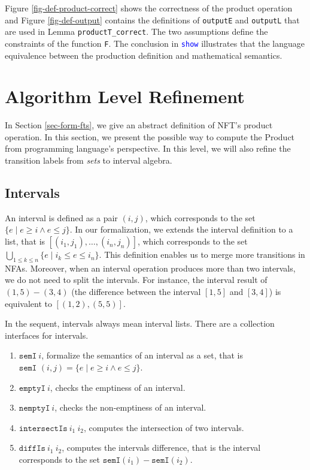 \documentclass[a4paper,UKenglish,cleveref, autoref, thm-restate]{lipics-v2021}
\begin{document}
Figure \ref{fig-def-product-correct} shows the correctness of the product operation and Figure \ref{fig-def-output} contains the definitions of \texttt{outputE} and \texttt{outputL} that are used in Lemma \texttt{productT\_correct}.
The two assumptions define the constraints of the function \texttt{F}.
The conclusion in \textcolor{blue}{\texttt{show}} illustrates 
that the language equivalence between the production definition and mathematical semantics.

\section{Algorithm Level Refinement}
\label{sec_alg_refinement}
In Section \ref{sec-form-fts}, we give an abstract definition of NFT's product operation. In this section, we present the possible way to compute the Product from programming language's perspective.
In this level, we will also refine the transition labels from \emph{sets} to interval algebra.

\subsection{Intervals}
An interval is defined as a pair $(i, j)$, which corresponds to the set $\{e \mid e \geq i \land e \leq j\}$. In our formalization, we extends the interval definition to a list, that is $[(i_1, j_1), \ldots, (i_n, j_n)]$, which corresponds to the set $\bigcup_{1\leq k\leq n}\{e \mid i_k \leq e \leq i_n\}$. This definition enables us to merge more transitions in NFAs. Moreover, when an interval operation produces more than two intervals, we do not need to split the intervals. For instance, the interval result of $(1, 5) - (3, 4)$ (the difference between the interval $[1, 5]$ and $[3, 4]$) is equivalent to $[(1, 2), (5, 5)]$.


In the sequent, intervals always mean interval lists.
There are a collection interfaces for intervals. 
\begin{enumerate}
  \item $\texttt{semI}~i$, formalize the semantics of an interval as a set, that is $\texttt{semI }(i,j) = \{e \mid e \geq i \land e \leq j\}$.
  \item $\texttt{emptyI}~i$, checks the emptiness of an interval.
   \item $\texttt{nemptyI}~i$, checks the non-emptiness of an interval.
  \item $\texttt{intersectIs}~i_1~i_2$, computes the intersection of two intervals.
  \item $\texttt{diffIs}~i_1~i_2$, computes the intervals difference, that is the interval corresponds to the set $\texttt{semI}(i_1)-\texttt{semI}(i_2)$.
\end{enumerate}
\end{document}
